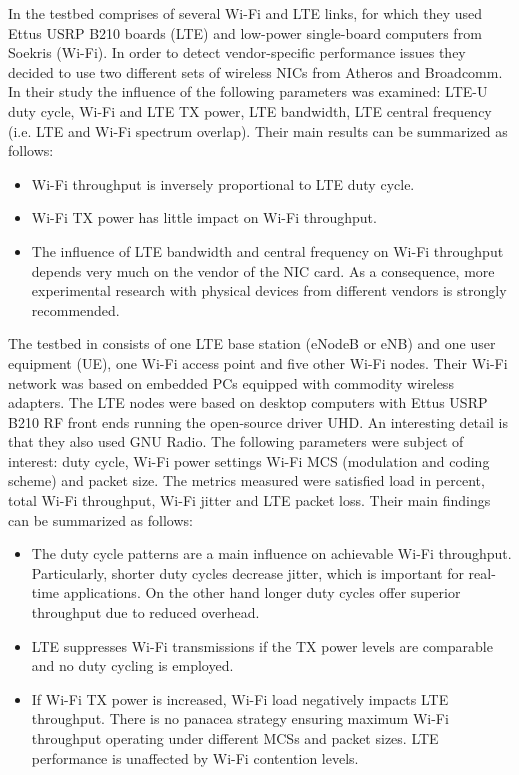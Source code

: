 In \cite{gomezmiguelez16} the testbed comprises of several Wi-Fi and LTE links, for which they used Ettus USRP B210 boards (LTE) and low-power single-board computers from Soekris (Wi-Fi). In order to detect vendor-specific performance issues they decided to use two different sets of wireless NICs from Atheros and Broadcomm. In their study the influence of the following parameters was examined: LTE-U duty cycle, Wi-Fi and LTE TX power, LTE bandwidth, LTE central frequency (i.e. LTE and Wi-Fi spectrum overlap). Their main results can be summarized as follows:
\begin{itemize}
	\item  Wi-Fi throughput is inversely proportional to LTE duty cycle.
	\item  Wi-Fi TX power has little impact on Wi-Fi throughput.
	\item  The influence of LTE bandwidth and central frequency on Wi-Fi throughput depends very much on the vendor of the NIC card. As a consequence, more experimental research with physical devices from different vendors is strongly recommended. 
\end{itemize}
  
The testbed in\cite{capretti16} consists of one LTE base station (eNodeB or eNB) and one user equipment (UE), one Wi-Fi access point and five other Wi-Fi nodes. Their Wi-Fi network was based on embedded PCs equipped with commodity wireless adapters. The LTE nodes were based on desktop computers with Ettus USRP B210 RF front ends running the open-source driver UHD. An interesting detail is that they also used GNU Radio. The following parameters were subject of interest: duty cycle, Wi-Fi power settings Wi-Fi MCS (modulation and coding scheme) and packet size. The metrics measured were satisfied load in percent, total Wi-Fi throughput, Wi-Fi jitter and LTE packet loss.  Their main findings can be summarized as follows: 
\begin{itemize}
	\item The duty cycle patterns are a main influence on achievable Wi-Fi throughput. Particularly, shorter duty cycles decrease jitter, which is important for real-time applications. On the other hand longer duty cycles offer superior throughput due to reduced overhead.
	\item LTE suppresses Wi-Fi transmissions if the TX power levels are comparable and no duty cycling is employed.
	\item If Wi-Fi TX power is increased, Wi-Fi load negatively impacts LTE throughput. There is no panacea strategy ensuring maximum Wi-Fi throughput operating under different MCSs and packet sizes. LTE performance is unaffected by Wi-Fi contention levels.
\end{itemize}

